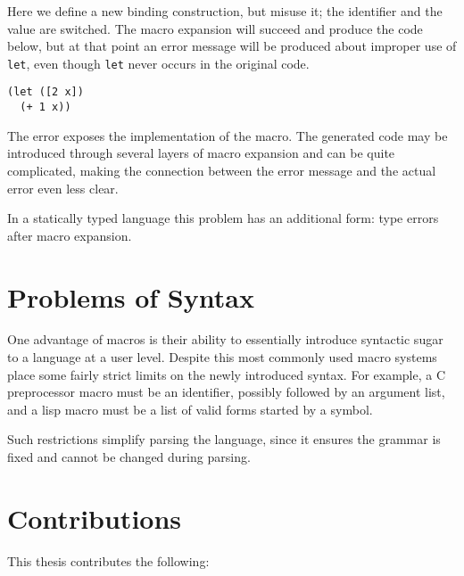 \documentclass{kththesis}
\begin{document}
Here we define a new binding construction, but misuse it; the identifier and the value are switched. The macro expansion will succeed and produce the code below, but at that point an error message will be produced about improper use of \texttt{let}, even though \texttt{let} never occurs in the original code.

\begin{verbatim}
(let ([2 x])
  (+ 1 x))
\end{verbatim}

The error exposes the implementation of the macro. The generated code may be introduced through several layers of macro expansion and can be quite complicated, making the connection between the error message and the actual error even less clear.

In a statically typed language this problem has an additional form: type errors after macro expansion.

\section{Problems of Syntax} \label{sec:problem-syntax}

One advantage of macros is their ability to essentially introduce syntactic sugar to a language at a user level. Despite this most commonly used macro systems place some fairly strict limits on the newly introduced syntax. For example, a C preprocessor macro must be an identifier, possibly followed by an argument list, and a lisp macro must be a list of valid forms started by a symbol.

Such restrictions simplify parsing the language, since it ensures the grammar is fixed and cannot be changed during parsing.

\section{Contributions}

This thesis contributes the following:
\end{document}
